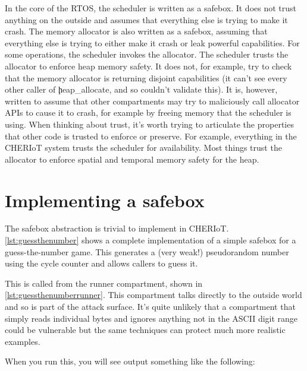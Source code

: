 In the core of the RTOS, the scheduler is written as a safebox.
It does not trust anything on the outside and assumes that everything else is trying to make it crash.
The memory allocator is also written as a safebox, assuming that everything else is trying to either make it crash or leak powerful capabilities.
For some operations, the scheduler invokes the allocator.
The scheduler trusts the allocator to enforce heap memory safety.
It does not, for example, try to check that the memory allocator is returning disjoint capabilities (it can't see every other caller of \c{heap_allocate}, and so couldn't validate this).
It is, however, written to assume that other compartments may try to maliciously call allocator APIs to cause it to crash, for example by freeing memory that the scheduler is using.
When thinking about trust, it's worth trying to articulate the properties that other code is trusted to enforce or preserve.
For example, everything in the CHERIoT system trusts the scheduler for availability.
Most things trust the allocator to enforce spatial and temporal memory safety for the heap.

\section{Implementing a safebox}

The safebox abstraction is trivial to implement in CHERIoT.
\ref{lst:guessthenumber} shows a complete implementation of a simple safebox for a guess-the-number game.
This generates a (very weak!) pseudorandom number using the cycle counter and allows callers to guess it.

\codelisting[marker=safebox,caption=A safebox for a guess-the-numbers game,label=lst:guessthenumber, filename=examples/safebox/safebox.cc]{}

This is called from the runner compartment, shown in \ref{lst:guessthenumberrunner}.
This compartment talks directly to the outside world and so is part of the attack surface.
It's quite unlikely that a compartment that simply reads individual bytes and ignores anything not in the ASCII digit range could be vulnerable but the same techniques can protect much more realistic examples.

\codelisting[marker=runner,caption=The runner compartment for the guess-the-numbers game,label=lst:guessthenumberrunner, filename=examples/safebox/runner.cc]{}

When you run this, you will see output something like the following:


